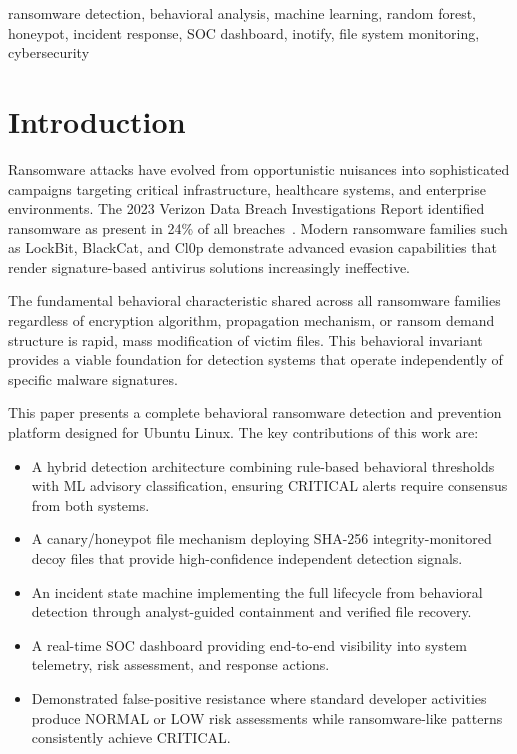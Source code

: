 \documentclass[conference]{IEEEtran}
\begin{document}
\begin{IEEEkeywords}
ransomware detection, behavioral analysis, machine learning,
random forest, honeypot, incident response, SOC dashboard,
inotify, file system monitoring, cybersecurity
\end{IEEEkeywords}


\section{Introduction}

Ransomware attacks have evolved from opportunistic nuisances
into sophisticated campaigns targeting critical infrastructure,
healthcare systems, and enterprise environments. The 2023
Verizon Data Breach Investigations Report identified ransomware
as present in 24\% of all breaches~\cite{verizon2023}. Modern
ransomware families such as LockBit, BlackCat, and Cl0p
demonstrate advanced evasion capabilities that render
signature-based antivirus solutions increasingly ineffective.

The fundamental behavioral characteristic shared across all
ransomware families regardless of encryption algorithm,
propagation mechanism, or ransom demand structure is rapid,
mass modification of victim files. This behavioral invariant
provides a viable foundation for detection systems that
operate independently of specific malware signatures.

This paper presents a complete behavioral ransomware detection
and prevention platform designed for Ubuntu Linux. The
key contributions of this work are:

\begin{itemize}
    \item A hybrid detection architecture combining rule-based
    behavioral thresholds with ML advisory classification,
    ensuring CRITICAL alerts require consensus from both systems.
    
    \item A canary/honeypot file mechanism deploying SHA-256
    integrity-monitored decoy files that provide high-confidence
    independent detection signals.
    
    \item An incident state machine implementing the full
    lifecycle from behavioral detection through analyst-guided
    containment and verified file recovery.
    
    \item A real-time SOC dashboard providing end-to-end
    visibility into system telemetry, risk assessment, and
    response actions.
    
    \item Demonstrated false-positive resistance where standard
    developer activities produce NORMAL or LOW risk assessments
    while ransomware-like patterns consistently achieve CRITICAL.
\end{itemize}
\end{document}
